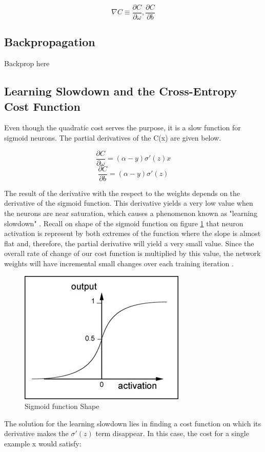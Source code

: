 \documentclass{article}
\begin{document}
$$\nabla C \equiv \frac{\partial C}{\partial \omega}, \frac{\partial C}{\partial b}$$
\subsection{Backpropagation}\label{subsec:backprop}
Backprop here
\subsection{Learning Slowdown and the Cross-Entropy Cost Function}\label{subsec:cross_entropy}
Even though the quadratic cost serves the purpose, it is a slow function for sigmoid neurons. The partial derivatives of the C(x) are given below.

$$\frac{\partial C}{\partial \omega} = (\alpha - y)\sigma'(z)x$$
$$\frac{\partial C}{\partial b} = (\alpha - y)\sigma'(z) $$

The result of the derivative with the respect to the weights depends on the derivative of the sigmoid function. This derivative yields a very low value when the neurons are near saturation, which causes a phenomenon known as "learning slowdown" \cite{nielsen2016}. Recall on shape of the sigmoid function on figure \ref{fig:sigmoid} that neuron activation is represent by both extremes of the function where the slope is almost flat and, therefore, the partial derivative will yield a very small value. Since the overall rate of change of our cost function is multiplied by this value, the network weights will have incremental small changes over each training iteration \cite{nielsen2016}.


\begin{figure}[h!]
\centering
	\includegraphics[scale=0.6]{sigmoid.jpg}
\caption{Sigmoid function Shape}
\label{fig:sigmoid}
\end{figure}
The solution for the learning slowdown lies in finding a cost function on which its derivative makes the $\sigma'(z)$ term disappear. In this case, the cost for a single example x would satisfy:
\end{document}
